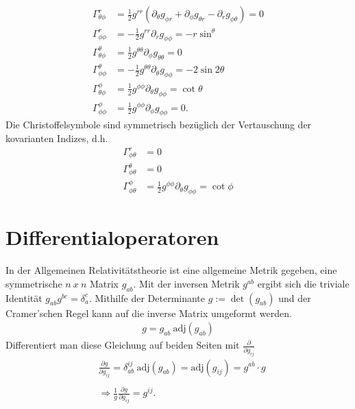 \documentclass[a4paper]{article}
\begin{document}
\begin{align}
\Gamma^{r}_{\theta\phi}&=\frac{1}{2}g^{rr}(\partial_\theta g_{\phi r}
+\partial_\phi g_{\theta r} - \partial_r g_{\phi\theta}) = 0\\
    \Gamma^{r}_{\phi\phi} &=-\frac{1}{2}g^{rr}\partial_r g_{\phi\phi}=
    -r\sin^\theta\\
    \Gamma^{\theta}_{\theta\phi} &= \frac{1}{2}g^{\theta\theta}\partial_\phi
    g_{\theta\theta} = 0\\
    \Gamma^{\theta}_{\phi\phi} &= -\frac{1}{2}g^{\theta\theta}\partial_\theta
    g_{\phi\phi} = -2\sin2\theta\\
    \Gamma^{\phi}_{\theta\phi} &= \frac{1}{2}g^{\phi\phi}\partial_\theta
    g_{\phi\phi} = \cot\theta\\
    \Gamma^{\phi}_{\phi\phi} &= \frac{1}{2}g^{\phi\phi}\partial_\phi
    g_{\phi\phi} = 0.
\end{align}
Die Christoffelsymbole sind symmetrisch bezüglich der Vertauschung der
kovarianten Indizes, d.h.
\begin{align}
    \Gamma^r_{\phi\theta} &= 0\\
    \Gamma^\theta_{\phi\theta} &= 0 \\
    \Gamma^\phi_{\phi\theta} & = \frac{1}{2} g^{\phi\phi} \partial_\theta
    g_{\phi\phi} = \cot\phi
\end{align}
\section{Differentialoperatoren}
In der Allgemeinen Relativitätstheorie ist eine allgemeine Metrik gegeben,
eine symmetrische $n\ x\ n$ Matrix $g_{ab}$. Mit der inversen Metrik $g^{ab}$
ergibt sich die triviale Identität $g_{ab}g^{bc} = \delta ^c_a$. Mithilfe der
Determinante $g := \det(g_{ab})$ und der Cramer'schen Regel
kann auf die inverse Matrix umgeformt
werden.
\begin{align}
    g = g_{ab}\ \text{adj}(g_{ab})
\end{align}
Differentiert man diese Gleichung auf beiden Seiten mit
$\frac{\partial}{\partial g_{ij}}$
\begin{align}
    &\frac{\partial g }{\partial g_{ij}} = \delta_{ab}^{ij}\
    \text{adj}(g_{ab}) = \text{adj}(g_{ij}) = g^{ab} \cdot g \\
    \nonumber \\
    &\Rightarrow \frac{1}{g} \frac{\partial g}{\partial g_{ij}} =
    g^{ij}.
\end{align}
\end{document}

